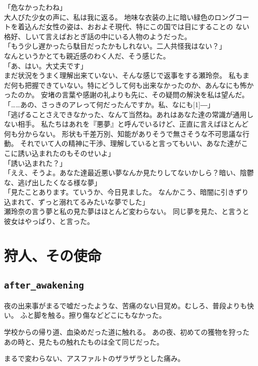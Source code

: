 \documentclass[autodetect-engine,dvipdfmx-if-dvi,a5paper,ja=standard,twoside,titlepage,final,twocolumn]{ltjtbook}
\begin{document}
「危なかったわね」\\
大人びた少女の声に、私は我に返る。
地味な衣装の上に暗い緑色のロングコートを着込んだ女性の姿は、おおよそ現代、特にこの国では目にすることの
ない格好、しいて言えばおとぎ話の中にいる人物のようだった。\\
「もう少し遅かったら駄目だったかもしれない。二人共怪我はない？」\\
なんというかとても親近感のわく人だ、そう感じた。\\
「あ、はい。大丈夫です」\\
まだ状況をうまく理解出来ていない、そんな感じで返事をする瀬玲奈。
私もまだ何も把握できていない。特にどうして何も出来なかったのか、あんなにも怖かったのか。
安堵の言葉や感謝の礼よりも先に、その疑問の解決を私は望んだ。\\
「……あの、さっきのアレって何だったんですか。私、なにも\scalebox{3}[1]{―}」\\
「逃げることさえできなかった、なんて当然ね。あれはあなた達の常識が通用しない相手。
私たちはあれを『悪夢』と呼んでいるけど、正直に言えばほとんど何も分からない。
形状も千差万別、知能がありそうで無さそうな不可思議な行動。
それでいて人の精神に干渉、理解していると言ってもいい、あなた達がここに誘い込まれたのもそのせいよ」\\
「誘い込まれた？」\\
「ええ、そうよ。あなた達最近悪い夢なんか見たりしてないかしら？暗い、陰鬱な、逃げ出したくなる様な夢」\\
「見たことあります。ていうか、今日見ました。
なんかこう、暗闇に引きずり込まれて、ずっと溺れてるみたいな夢でした」\\
瀬玲奈の言う夢と私の見た夢はほとんど変わらない。
同じ夢を見た、と言うと彼女はやっぱり、と言った。\\

\chapter{\rm 狩人、その使命}
\section{\tt \large after\_awakening}
夜の出来事がまるで嘘だったような、苦痛のない目覚め。むしろ、普段よりも快い。
ふと脚を触る。擦り傷などどこにもなかった。

学校からの帰り道、血染めだった道に触れる。
あの夜、初めての獲物を狩ったあの時と、見たもの触れたものは全て同じだった。

まるで変わらない、アスファルトのザラザラとした痛み。\\
\end{document}
